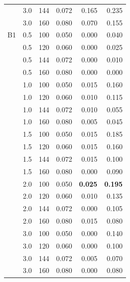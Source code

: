 \begin{table}[t]
\begin{tabular}{lrrrrr}
 & 3.0 & 144 & 0.072 & 0.165 & 0.235\\
 & 3.0 & 160 & 0.080 & 0.070 & 0.155\\
\addlinespace
B1 & 0.5 & 100 & 0.050 & 0.000 & 0.040\\
 & 0.5 & 120 & 0.060 & 0.000 & 0.025\\
 & 0.5 & 144 & 0.072 & 0.000 & 0.010\\
 & 0.5 & 160 & 0.080 & 0.000 & 0.000\\
 & 1.0 & 100 & 0.050 & 0.015 & 0.160\\
 & 1.0 & 120 & 0.060 & 0.010 & 0.115\\
 & 1.0 & 144 & 0.072 & 0.010 & 0.055\\
 & 1.0 & 160 & 0.080 & 0.005 & 0.045\\
 & 1.5 & 100 & 0.050 & 0.015 & 0.185\\
 & 1.5 & 120 & 0.060 & 0.015 & 0.160\\
 & 1.5 & 144 & 0.072 & 0.015 & 0.100\\
 & 1.5 & 160 & 0.080 & 0.000 & 0.090\\
 & 2.0 & 100 & 0.050 & \textbf{0.025} & \textbf{0.195}\\
 & 2.0 & 120 & 0.060 & 0.010 & 0.135\\
 & 2.0 & 144 & 0.072 & 0.000 & 0.105\\
 & 2.0 & 160 & 0.080 & 0.015 & 0.080\\
 & 3.0 & 100 & 0.050 & 0.000 & 0.140\\
 & 3.0 & 120 & 0.060 & 0.000 & 0.100\\
 & 3.0 & 144 & 0.072 & 0.005 & 0.070\\
 & 3.0 & 160 & 0.080 & 0.000 & 0.080\\
\bottomrule
\end{tabular}
\end{table}
